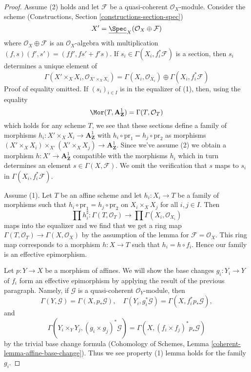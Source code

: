 \begin{proof}
Assume (2) holds and let $\mathcal{F}$ be a quasi-coherent
$\mathcal{O}_X$-module. Consider the scheme
(Constructions, Section \ref{constructions-section-spec})
$$
X' = \underline{\Spec}_X(\mathcal{O}_X \oplus \mathcal{F})
$$
where $\mathcal{O}_X \oplus \mathcal{F}$ is an
$\mathcal{O}_X$-algebra with multiplication
$(f, s)(f', s') = (ff', fs' + f's)$.
If $s_i \in \Gamma(X_i, f_i^*\mathcal{F})$ is a section,
then $s_i$ determines a unique element of
$$
\Gamma(X' \times_X X_i, \mathcal{O}_{X' \times_X X_i}) =
\Gamma(X_i, \mathcal{O}_{X_i}) \oplus \Gamma(X_i, f_i^*\mathcal{F})
$$
Proof of equality omitted.
If $(s_i)_{i \in I}$ is in the equalizer of (1), then, using the equality
$$
\Mor(T, \mathbf{A}^1_\mathbf{Z}) = \Gamma(T, \mathcal{O}_T)
$$
which holds for any scheme $T$, we see that these sections define
a family of morphisms $h_i : X' \times_X X_i \to \mathbf{A}^1_\mathbf{Z}$ with
$h_i \circ \text{pr}_1 = h_j \circ \text{pr}_2$ as morphisms
$(X' \times_X X_i) \times_{X'} (X' \times_X X_j) \to \mathbf{A}^1_\mathbf{Z}$.
Since we've assume (2) we obtain a morphism
$h : X' \to \mathbf{A}^1_\mathbf{Z}$ compatible with the morphisms $h_i$
which in turn determines
an element $s \in \Gamma(X, \mathcal{F})$.
We omit the verification that $s$ maps to $s_i$ in
$\Gamma(X_i, f_i^*\mathcal{F})$.

\medskip\noindent
Assume (1). Let $T$ be an affine scheme and let $h_i : X_i \to T$
be a family of morphisms such that
$h_i \circ \text{pr}_1 = h_j \circ \text{pr}_2$ on
$X_i \times_X X_j$ for all $i, j \in I$. Then
$$
\prod h_i^\sharp :
\Gamma(T, \mathcal{O}_T)
\to
\prod \Gamma(X_i, \mathcal{O}_{X_i})
$$
maps into the equalizer and we find that we get a ring map
$\Gamma(T, \mathcal{O}_T) \to \Gamma(X, \mathcal{O}_X)$
by the assumption of the lemma for $\mathcal{F} = \mathcal{O}_X$.
This ring map corresponds to a morphism $h : X \to T$ such
that $h_i = h \circ f_i$. Hence our family is an effective
epimorphism.

\medskip\noindent
Let $p : Y \to X$ be a morphism of affines. We will show
the base changes $g_i : Y_i \to Y$ of $f_i$ form an effective epimorphism
by applying the result of the previous paragraph.
Namely, if $\mathcal{G}$ is a quasi-coherent $\mathcal{O}_Y$-module, then
$$
\Gamma(Y, \mathcal{G}) = \Gamma(X, p_*\mathcal{G}),\quad
\Gamma(Y_i, g_i^*\mathcal{G}) = \Gamma(X, f_i^*p_*\mathcal{G}),
$$
and
$$
\Gamma(Y_i \times_Y Y_j, (g_i \times g_j)^*\mathcal{G}) =
\Gamma(X, (f_i \times f_j)^*p_*\mathcal{G})
$$
by the trivial base change formula
(Cohomology of Schemes, Lemma \ref{coherent-lemma-affine-base-change}).
Thus we see property (1) lemma holds for the family $g_i$.
\end{proof}

